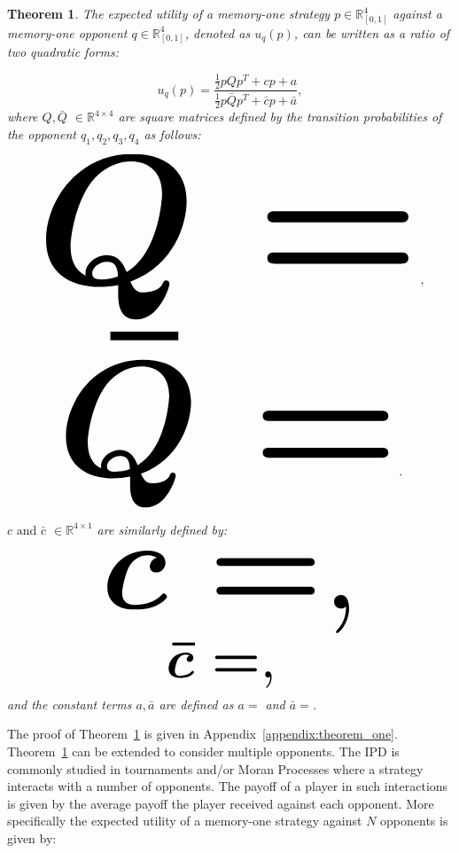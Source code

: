 \documentclass[10pt]{article}
\newcommand{\R}{\mathbb{R}}
\newtheorem{theorem}{Theorem}
\begin{document}
\begin{theorem}\label{theorem_one}
    The expected utility of a memory-one strategy \(p\in\mathbb{R}_{[0,1]}^4\)
    against a memory-one opponent \(q\in\mathbb{R}_{[0,1]}^4\), denoted
    as \(u_q(p)\), can be written as a ratio of two quadratic forms:

    \begin{equation}\label{eq:optimisation_quadratic}
    u_q(p) = \frac{\frac{1}{2}pQp^T + cp + a}
                {\frac{1}{2}p\bar{Q}p^T + \bar{c}p + \bar{a}},
    \end{equation}
    where \(Q, \bar{Q}\) \(\in \R^{4\times4}\) are square matrices defined by the
    transition probabilities of the opponent \(q_1, q_2, q_3, q_4\) as follows:

    \begin{center}
    \begin{equation}
    \resizebox{0.9\linewidth}{!}{\arraycolsep=2.5pt%
    \boldmath\(
    Q = \)},
    \end{equation}
    \begin{equation}\label{eq:q_bar_matrix}
    \resizebox{0.8\linewidth}{!}{\arraycolsep=2.5pt%
    \boldmath\(
    \bar{Q} =  \)}.
    \end{equation}
    \end{center}

    \(c \text{ and } \bar{c}\) \(\in \R^{4 \times 1}\) are similarly defined by:

    \begin{equation}\label{eq:q_matrix_numerator}
    \resizebox{0.6\linewidth}{!}{\arraycolsep=2.5pt%
    \boldmath\(c = \),}
    \end{equation}
    \begin{equation}\label{eq:q_matrix_denominator}
    \resizebox{0.3\linewidth}{!}{\arraycolsep=2.5pt%
    \boldmath\(\bar{c} = \),
    }
    \end{equation}
    and the constant terms \(a, \bar{a}\) are defined as \(a = \) and
    \(\bar{a} = \).
\end{theorem}

The proof of Theorem~\ref{theorem_one} is given in
Appendix~\ref{appendix:theorem_one}.
Theorem~\ref{theorem_one} can be extended to consider multiple
opponents. The IPD is commonly studied in tournaments and/or Moran Processes
where a strategy interacts with a number of opponents. The payoff of a player in
such interactions is given by the average payoff the player received against
each opponent. More specifically the expected utility of a memory-one strategy
against \(N\) opponents is given by:
\end{document}
